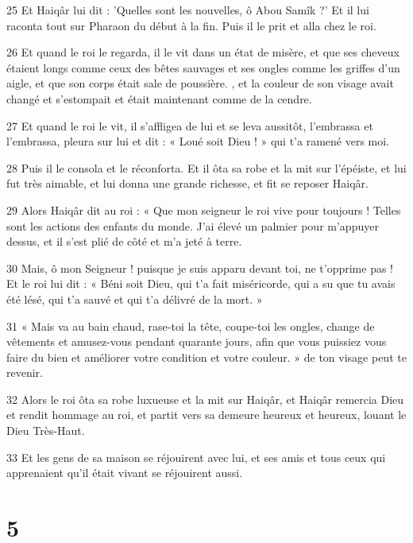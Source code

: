 \par 25 Et Haiqâr lui dit : 'Quelles sont les nouvelles, ô Abou Samîk ?' Et il lui raconta tout sur Pharaon du début à la fin. Puis il le prit et alla chez le roi.

\par 26 Et quand le roi le regarda, il le vit dans un état de misère, et que ses cheveux étaient longs comme ceux des bêtes sauvages et ses ongles comme les griffes d'un aigle, et que son corps était sale de poussière. , et la couleur de son visage avait changé et s'estompait et était maintenant comme de la cendre.

\par 27 Et quand le roi le vit, il s'affligea de lui et se leva aussitôt, l'embrassa et l'embrassa, pleura sur lui et dit : « Loué soit Dieu ! » qui t'a ramené vers moi.

\par 28 Puis il le consola et le réconforta. Et il ôta sa robe et la mit sur l'épéiste, et lui fut très aimable, et lui donna une grande richesse, et fit se reposer Haiqâr.

\par 29 Alors Haiqâr dit au roi : « Que mon seigneur le roi vive pour toujours ! Telles sont les actions des enfants du monde. J'ai élevé un palmier pour m'appuyer dessus, et il s'est plié de côté et m'a jeté à terre.

\par 30 Mais, ô mon Seigneur ! puisque je suis apparu devant toi, ne t'opprime pas ! Et le roi lui dit : « Béni soit Dieu, qui t'a fait miséricorde, qui a su que tu avais été lésé, qui t'a sauvé et qui t'a délivré de la mort. »

\par 31 « Mais va au bain chaud, rase-toi la tête, coupe-toi les ongles, change de vêtements et amusez-vous pendant quarante jours, afin que vous puissiez vous faire du bien et améliorer votre condition et votre couleur. » de ton visage peut te revenir.

\par 32 Alors le roi ôta sa robe luxueuse et la mit sur Haiqâr, et Haiqâr remercia Dieu et rendit hommage au roi, et partit vers sa demeure heureux et heureux, louant le Dieu Très-Haut.

\par 33 Et les gens de sa maison se réjouirent avec lui, et ses amis et tous ceux qui apprenaient qu'il était vivant se réjouirent aussi.

\chapter{5}

